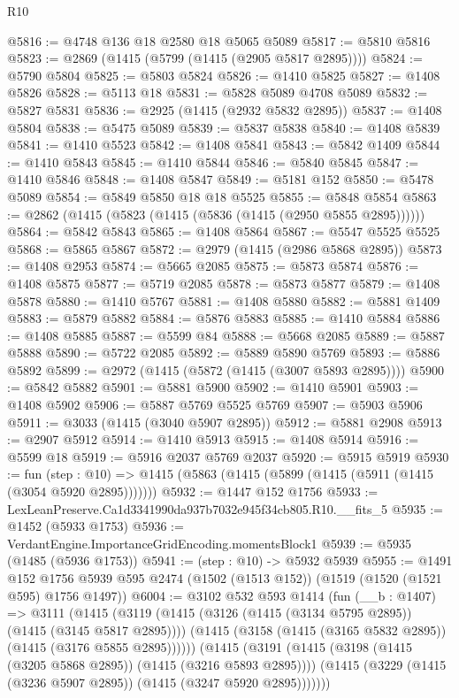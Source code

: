 \begin{lexlean}{R10}
\begin{coremodule}
@5816 := @4748 @136 @18 @2580 @18 @5065 @5089
@5817 := @5810 @5816
@5823 := @2869 (@1415 (@5799 (@1415 (@2905 @5817 @2895))))
@5824 := @5790 @5804
@5825 := @5803 @5824
@5826 := @1410 @5825
@5827 := @1408 @5826
@5828 := @5113 @18
@5831 := @5828 @5089 @4708 @5089
@5832 := @5827 @5831
@5836 := @2925 (@1415 (@2932 @5832 @2895))
@5837 := @1408 @5804
@5838 := @5475 @5089
@5839 := @5837 @5838
@5840 := @1408 @5839
@5841 := @1410 @5523
@5842 := @1408 @5841
@5843 := @5842 @1409
@5844 := @1410 @5843
@5845 := @1410 @5844
@5846 := @5840 @5845
@5847 := @1410 @5846
@5848 := @1408 @5847
@5849 := @5181 @152
@5850 := @5478 @5089
@5854 := @5849 @5850 @18 @18 @5525
@5855 := @5848 @5854
@5863 := @2862 (@1415 (@5823 (@1415 (@5836 (@1415 (@2950 @5855 @2895))))))
@5864 := @5842 @5843
@5865 := @1408 @5864
@5867 := @5547 @5525 @5525
@5868 := @5865 @5867
@5872 := @2979 (@1415 (@2986 @5868 @2895))
@5873 := @1408 @2953
@5874 := @5665 @2085
@5875 := @5873 @5874
@5876 := @1408 @5875
@5877 := @5719 @2085
@5878 := @5873 @5877
@5879 := @1408 @5878
@5880 := @1410 @5767
@5881 := @1408 @5880
@5882 := @5881 @1409
@5883 := @5879 @5882
@5884 := @5876 @5883
@5885 := @1410 @5884
@5886 := @1408 @5885
@5887 := @5599 @84
@5888 := @5668 @2085
@5889 := @5887 @5888
@5890 := @5722 @2085
@5892 := @5889 @5890 @5769
@5893 := @5886 @5892
@5899 := @2972 (@1415 (@5872 (@1415 (@3007 @5893 @2895))))
@5900 := @5842 @5882
@5901 := @5881 @5900
@5902 := @1410 @5901
@5903 := @1408 @5902
@5906 := @5887 @5769 @5525 @5769
@5907 := @5903 @5906
@5911 := @3033 (@1415 (@3040 @5907 @2895))
@5912 := @5881 @2908
@5913 := @2907 @5912
@5914 := @1410 @5913
@5915 := @1408 @5914
@5916 := @5599 @18
@5919 := @5916 @2037 @5769 @2037
@5920 := @5915 @5919
@5930 := fun (step : @10) =>
  @1415 (@5863 (@1415 (@5899 (@1415 (@5911 (@1415 (@3054 @5920 @2895)))))))
@5932 := @1447 @152 @1756
@5933 := LexLeanPreserve.Ca1d3341990da937b7032e945f34cb805.R10.__fits_5
@5935 := @1452 (@5933 @1753)
@5936 := VerdantEngine.ImportanceGridEncoding.momentsBlock1
@5939 := @5935 (@1485 (@5936 @1753))
@5941 := (step : @10) -> @5932 @5939
@5955 := @1491
    @152
    @1756
    @5939
    @595
    @2474
    (@1502 (@1513 @152))
    (@1519 (@1520 (@1521 @595) @1756 @1497))
@6004 := @3102
    @532
    @593
    @1414
    (fun (__b : @1407) =>
    @3111
      (@1415
        (@3119
          (@1415 (@3126 (@1415 (@3134 @5795 @2895)) (@1415 (@3145 @5817 @2895))))
          (@1415 (@3158 (@1415 (@3165 @5832 @2895)) (@1415 (@3176 @5855 @2895))))))
      (@1415
        (@3191
          (@1415 (@3198 (@1415 (@3205 @5868 @2895)) (@1415 (@3216 @5893 @2895))))
          (@1415 (@3229 (@1415 (@3236 @5907 @2895)) (@1415 (@3247 @5920 @2895)))))))

\end{coremodule}
\end{lexlean}
